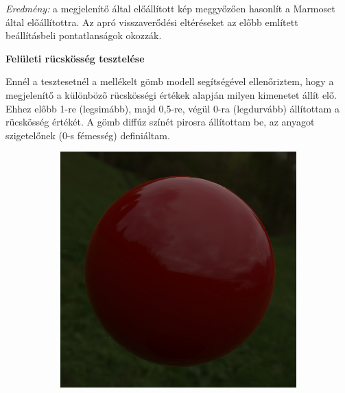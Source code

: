 \textit{Eredmény:} a megjelenítő által előállított kép meggyőzően hasonlít a Marmoset által előállítottra. Az apró visszaverődési eltéréseket az előbb említett beállításbeli pontatlanságok okozzák.

\vspace{15pt}

\textbf{Felületi rücskösség tesztelése}

Ennél a tesztesetnél a mellékelt gömb modell segítségével ellenőriztem, hogy a megjelenítő a különböző rücskösségi értékek alapján milyen kimenetet állít elő. Ehhez előbb 1-re (legsimább), majd 0,5-re, végül 0-ra (legdurvább) állítottam a rücskösség értékét. A gömb diffúz színét pirosra állítottam be, az anyagot szigetelőnek (0-s fémesség) definiáltam.

\begin{figure}[!ht]
    \centering
    \begin{subfigure}[b]{0.27\textwidth}
        \centering
        \includegraphics[width=\textwidth]{images/scr_r1.png}
    \end{subfigure}
    \hfill
    \begin{subfigure}[b]{0.27\textwidth}
        \centering

\end{subfigure}
\end{figure}
